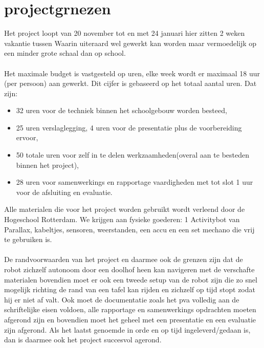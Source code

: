 \documentclass[oneside]{book}
\begin{document}
\chapter{projectgrnezen}
Het project loopt van 20 november tot en met 24 januari hier zitten 2 weken vakantie tussen
Waarin uiteraard wel gewerkt kan worden maar vermoedelijk op een minder grote schaal dan op
school.\\
\\
Het maximale budget is vastgesteld op uren, elke week wordt er maximaal 18 uur (per persoon) aan
gewerkt.
Dit cijfer is gebaseerd op het totaal aantal uren.
Dat zijn: 
\begin{itemize}
\item 32 uren voor de techniek binnen het schoolgebouw worden besteed,
\item 25 uren verslaglegging, 4 uren voor de presentatie plus de voorbereiding ervoor,
\item 50 totale uren voor zelf in te delen werkzaamheden(overal aan te besteden binnen het project),
\item 28 uren voor samenwerkings en rapportage vaardigheden met tot slot 1 uur voor de afsluiting en
evaluatie.
\end{itemize}
Alle materialen die voor het project worden gebruikt wordt verleend door de Hogeschool
Rotterdam.
We krijgen aan fysieke goederen: 1 Activitybot van Parallax, kabeltjes, sensoren, weerstanden, een
accu en een set mechano die vrij te gebruiken is.\\
\\
De randvoorwaarden van het project en daarmee ook de grenzen zijn dat de robot zichzelf
autonoom door een doolhof heen kan navigeren met
de verschafte materialen bovendien moet er ook een tweede setup van de robot zijn die zo snel
mogelijk richting de rand van een tafel kan rijden en zichzelf op tijd stopt zodat hij er niet af valt.
Ook moet de documentatie zoals het pva volledig aan de schriftelijke eisen voldoen, alle rapportage
en samenwerkings opdrachten moeten
afgerond zijn en bovendien moet het geheel met een presentatie en een evaluatie zijn afgerond.
Als het laatst genoemde in orde en op tijd ingeleverd/gedaan is, dan is daarmee ook het project
succesvol agerond.
\clearpage
\end{document}
